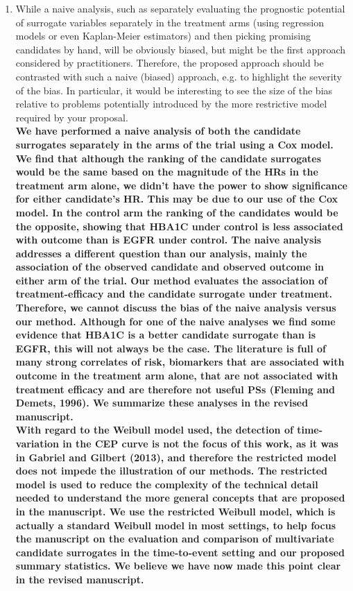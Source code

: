 \documentclass[11pt]{article} %
\begin{document}
\begin{enumerate}
\item While a naive analysis, such as separately evaluating the prognostic potential of surrogate variables separately in the treatment arms (using regression models or even Kaplan-Meier estimators) and then picking promising candidates by hand, will be obviously biased, but might be the first approach considered by practitioners. Therefore, the proposed approach should be contrasted with such a naive (biased) approach, e.g. to highlight the severity of the bias. In particular, it would be interesting to see the size of the bias relative to problems potentially introduced by the more restrictive model required by your proposal.\\
\textbf{We have performed a naive analysis of both the candidate surrogates separately in the arms of the trial using a Cox model. We find that although the ranking of the candidate surrogates would be the same based on the magnitude of the HRs in the treatment arm alone, we didn't have the power to show significance for either candidate's HR. This may be due to our use of the Cox model. In the control arm the ranking of the candidates would be the opposite, showing that HBA1C under control is less associated with outcome than is EGFR under control. The naive analysis addresses a different question than our analysis, mainly the association of the observed candidate and observed outcome in either arm of the trial. Our method evaluates the association of treatment-efficacy and the candidate surrogate under treatment. Therefore, we cannot discuss the bias of the naive analysis versus our method. Although for one of the naive analyses we find some evidence that HBA1C is a better candidate surrogate than is EGFR, this will not always be the case. The literature is full of many strong correlates of risk, biomarkers that are associated with outcome in the treatment arm alone, that are not associated with treatment efficacy and are therefore not useful PSs (Fleming and Demets, 1996). We summarize these analyses in the revised manuscript.\\
With regard to the Weibull model used, the detection of time-variation in the CEP curve is not the focus of this work, as it was in Gabriel and Gilbert (2013), and therefore the restricted model does not impede the illustration of our methods. The restricted model is used to reduce the complexity of the technical detail needed to understand the more general concepts that are proposed in the manuscript. We use the restricted Weibull model, which is actually a standard Weibull model in most settings, to help focus the manuscript on the evaluation and comparison of multivariate candidate surrogates in the time-to-event setting and our proposed summary statistics. We believe we have now made this point clear in the revised manuscript.}



\end{enumerate}
\end{document}
